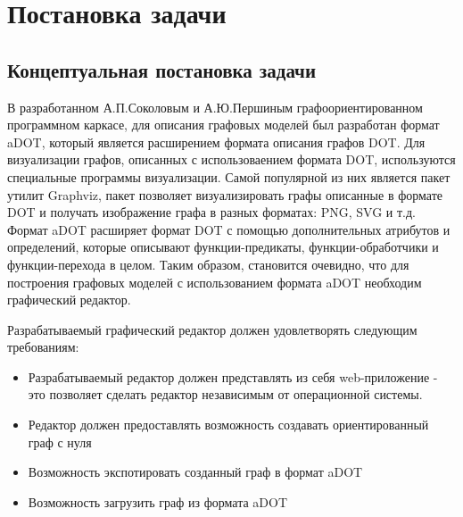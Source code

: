 \chapter{Постановка задачи}
\section{Концептуальная постановка задачи}

В разработанном А.П.Соколовым и А.Ю.Першиным графоориентированном программном каркасе, для описания графовых моделей был разработан формат aDOT, который является расширением формата описания графов DOT. Для визуализации графов, описанных с использоваением формата DOT, используются специальные программы визуализации. Самой популярной из них является пакет утилит Graphviz, пакет позволяет визуализировать графы описанные в формате DOT и получать изображение графа в разных форматах: PNG, SVG и т.д. Формат aDOT расширяет формат DOT с помощью дополнительных атрибутов и определений, которые описывают функции-предикаты, функции-обработчики и функции-перехода в целом. Таким образом, становится очевидно, что для построения графовых моделей с использованием формата aDOT необходим графический редактор. 

Разрабатываемый графический редактор должен удовлетворять следующим требованиям:
\begin{itemize}
	\item Разрабатываемый редактор должен представлять из себя web-приложение - это позволяет сделать редактор независимым от операционной системы.
	\item Редактор должен предоставлять возможность создавать ориентированный граф с нуля
	\item Возможность экспотировать созданный граф в формат aDOT
	\item Возможность загрузить граф из формата aDOT
\end{itemize}

